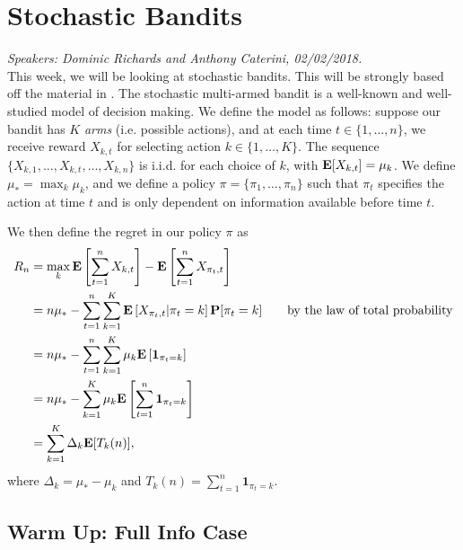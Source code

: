 \section{Stochastic Bandits} 
\emph{Speakers: Dominic Richards and Anthony Caterini, 02/02/2018.}\\

This week, we will be looking at stochastic bandits. This will be strongly based off the material in \cite[Lecture~18]{rigollet}. The stochastic multi-armed bandit is a well-known and well-studied model of decision making. We define the model as follows: suppose our bandit has $K$ \emph{arms} (i.e. possible actions), and at each time $t \in \{1, \ldots, n\}$, we receive reward $X_{k,t}$ for selecting action $k \in \{1, \ldots, K\}$. The sequence $\{X_{k, 1}, \ldots, X_{k, t}, \ldots, X_{k, n}\}$ is i.i.d. for each choice of $k$, with $\mathbf{E}[X_{k,t}] = \mu_k$. We define $\mu_* = \max_k \mu_k$, and we define a policy $\pi = \{\pi_1, \ldots, \pi_n\}$ such that $\pi_t$ specifies the action at time $t$ and is only dependent on information available before time $t$.

We then define the regret in our policy $\pi$ as 
\begin{align}
R_n &= \max_k \mathbf{E}\left[\sum_{t = 1}^n X_{k,t} \right] - \mathbf{E}\left[\sum_{t=1}^n X_{\pi_t, t} \right] \nonumber \\
&= n \mu_* - \sum_{t=1}^n \sum_{k=1}^K \mathbf{E}\left[ X_{\pi_t, t} | \pi_t = k\right] \mathbf{P}[\pi_t = k] \qquad \text{by the law of total probability} \nonumber \\
&= n \mu_* - \sum_{t=1}^n \sum_{k=1}^K \mu_k \mathbf{E}\left[ \mathbf{1}_{\pi_t = k}\right] \nonumber \\
&= n \mu_* - \sum_{k=1}^K \mu_k \mathbf{E} \left[\sum_{t=1}^n \mathbf{1}_{\pi_t = k} \right] \nonumber \\
&= \sum_{k=1}^K \Delta_k \mathbf{E}[T_k(n)], \label{eqn:bandit_regret}
\end{align}
where $\Delta_k = \mu_* - \mu_k$ and $T_k(n) = \sum_{t=1}^n \mathbf{1}_{\pi_t = k}$. 

\subsection{Warm Up: Full Info Case} 

